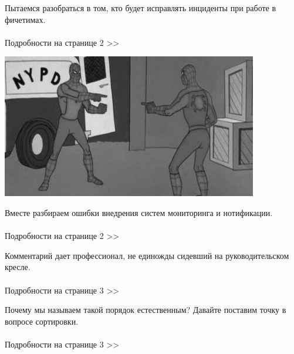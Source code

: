 \documentclass{article}
\date{\today}
\begin{document}
\maketitle

\begin{multicols}{3}

Пытаемся разобраться в том, кто будет исправлять инциденты при работе в фичетимах.
\\\\Подробности на странице 2 >>
\vspace{20mm}
\closearticle

\includegraphics[width=11.2cm]{spider.jpeg}

\end{multicols}

\begin{multicols}{3}

Вместе разбираем ошибки внедрения систем мониторинга и нотификации.
\\\\Подробности на странице 2 >>
\vspace{14mm}
\closearticle

Комментарий дает профессионал, не единожды сидевший на руководительском кресле.
\\\\Подробности на странице 3 >>
\closearticle

Почему мы называем такой порядок естественным? Давайте поставим точку в вопросе сортировки.
\\\\Подробности на странице 3 >>
\closearticle

\end{multicols}
\end{document}
